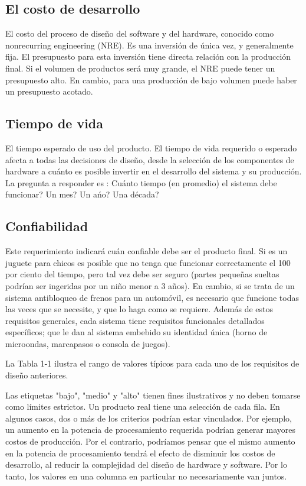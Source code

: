 \documentclass[output=paper, 
colorlinks,
citecolor=brown,
newtxmath
]{langscibook}
\begin{document}
\subsection {El costo de desarrollo}

El costo del proceso de diseño del software y del hardware, conocido como nonrecurring engineering
(NRE). Es una inversión de única vez, y generalmente fija. El presupuesto para
esta inversión tiene directa relación con la producción final. Si el volumen de productos
será muy grande, el NRE puede tener un presupuesto alto. En cambio, para una producción
de bajo volumen puede haber un presupuesto acotado.


\subsection {Tiempo de vida}

El tiempo esperado de uso del producto. El tiempo de vida requerido o esperado
afecta a todas las decisiones de diseño, desde la selección de los componentes
de hardware a cuánto es posible invertir en el desarrollo del sistema y su 
producción. La pregunta a responder es : Cuánto tiempo (en promedio) el sistema
debe funcionar? Un mes? Un ańo? Una década?



\subsection {Confiabilidad}

Este requerimiento indicará cuán confiable debe ser el producto final. 
Si es un juguete para chicos es posible que no tenga que funcionar correctamente el 100 por 
ciento del tiempo, pero tal vez debe ser seguro (partes pequeñas sueltas podrían ser ingeridas por 
un niño menor a 3 años). En cambio, si se trata de un sistema antibloqueo 
de frenos para un automóvil, es necesario que funcione todas las veces
que se necesite, y que lo haga como se requiere.
Además de estos requisitos generales, cada sistema tiene requisitos funcionales 
detallados específicos; que le dan al sistema embebido su identidad única (horno de microondas, marcapasos o consola de juegos).

La Tabla 1-1 ilustra el rango de valores típicos para cada uno de los requisitos de diseño anteriores. 

Las etiquetas "bajo", "medio" y "alto" tienen fines ilustrativos y no deben tomarse como límites estrictos. 
Un producto real tiene una selección de cada fila. En algunos casos, dos o más de los criterios 
podrían estar vinculados. Por ejemplo, un aumento en la potencia de procesamiento 
requerida podrían generar mayores costos de producción. 
Por el contrario, podríamos pensar que el mismo aumento en la potencia de 
procesamiento tendrá el efecto de disminuir los costos de desarrollo, 
al reducir la complejidad del diseño de hardware y software. 
Por lo tanto, los valores en una columna en particular no necesariamente van juntos.
\end{document}
